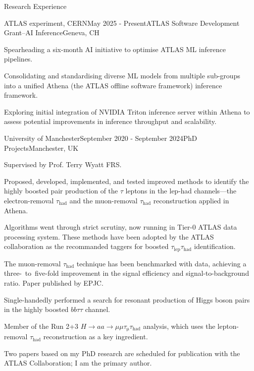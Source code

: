 \documentclass[11pt]{resume} %
\begin{document}
    \begin{rSection}{Research Experience}
        \begin{rSubsection}{ATLAS experiment, CERN}{May 2025 - Present}{ATLAS Software Development Grant--AI Inference}{Geneva, CH}
            \item Spearheading a six-month AI initiative to optimise ATLAS ML inference pipelines.
            \item Consolidating and standardising diverse ML models from multiple sub-groups into a unified Athena (the ATLAS offline software framework) inference framework.
            \item Exploring initial integration of NVIDIA Triton inference server within Athena to assess potential improvements in inference throughput and scalability.
        \end{rSubsection}
        \begin{rSubsection}{University of Manchester}{September 2020 - September 2024}{PhD Projects}{Manchester, UK}
            \item   Supervised by Prof. Terry Wyatt FRS. 
            \item   Proposed, developed, implemented, and tested improved methods to identify the highly boosted pair production of the $\tau$ leptons in the lep-had channels---the electron-removal $\tau_\mathrm{had}$ and the muon-removal $\tau_\mathrm{had}$ reconstruction applied in Athena.
            \item   Algorithms went through strict scrutiny, now running in Tier-0 ATLAS data processing system. These methods have been
                adopted by the ATLAS collaboration as the recommanded taggers for boosted $\tau_\mathrm{lep}\tau_\mathrm{had}$ identification.
            \item   The muon-removal $\tau_\mathrm{had}$ technique has been benchmarked with data, achieving a three-~to~five-fold 
                improvement in the signal efficiency and signal-to-background ratio. Paper published by EPJC.
            \item   Single-handedly performed a search for resonant production of Higgs boson pairs in the highly boosted $bb\tau\tau$ channel. 
            \item   Member of the Run 2+3 $H\rightarrow aa\rightarrow \mu\mu\tau_\mathrm{\mu}\tau_\mathrm{had}$ analysis, which uses the lepton-removal $\tau_\mathrm{had}$ reconstruction as a key ingredient.
            \item   Two papers based on my PhD research are scheduled for publication with the ATLAS Collaboration; I am the primary author.

\end{rSubsection}
\end{rSection}
\end{document}
